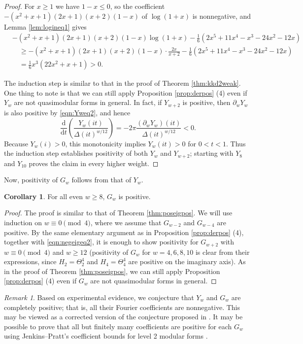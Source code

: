 \documentclass[10pt,reqno]{amsproc}
\newcommand{\dd}{\mathrm{d}}
\newcommand{\1}{\mathds{1}}	%
\theoremstyle{definition}
\newtheorem{corollary}[theorem]{Corollary}
\theoremstyle{remark}
\newtheorem{remark}[theorem]{Remark}
\begin{document}
\begin{proof}
    For $x \ge 1$ we have $1 - x \le 0$, so the coefficient $-(x^2+x+1)(2x+1)(x+2)(1-x)$ of $\log(1+x)$ is nonnegative, and Lemma \ref{lem:logineq1} gives
    \begin{align*}
        &-(x^2+x+1)(2x+1)(x+2)(1-x) \log(1+x) - \frac{1}{6} (2 x^5 + 11 x^4 - x^3 - 24 x^2 - 12 x) \\
        &\quad\ge -(x^2+x+1)(2x+1)(x+2)(1-x) \cdot \frac{2x}{x+2} - \frac{1}{6} (2 x^5 + 11 x^4 - x^3 - 24 x^2 - 12 x) \\
        &\quad= \frac{1}{6}x^3(22x^2 +x + 1) > 0.
    \end{align*}

    The induction step is similar to that in the proof of Theorem \ref{thm:kkd2weak}.
    One thing to note is that we can still apply Proposition \ref{prop:derpos} (4) even if $Y_{w}$ are not quasimodular forms in general.
    In fact, if $Y_{w+2}$ is positive, then $\partial_w Y_w$ is also positive by \eqref{eqn:Yweq2}, and hence
    \[
        \frac{\dd}{\dd t}\left(\frac{Y_w(it)}{\Delta(it)^{w/12}}\right)
        =-2\pi\frac{(\partial_w Y_w)(it)}{\Delta(it)^{w/12}}<0.
    \]
    Because $Y_w(i)>0$, this monotonicity implies $Y_w(it)>0$ for $0<t<1$.
    Thus the induction step establishes positivity of both $Y_w$ and $Y_{w+2}$; starting with $Y_8$ and $Y_{10}$ proves the claim in every higher weight.
\end{proof}

Now, positivity of $G_{w}$ follows from that of $Y_{w}$.

\begin{corollary}
\label{cor:negeigpos}
For all even $w \geq 8$, $G_{w}$ is positive.
\end{corollary}
\begin{proof}
    The proof is similar to that of Theorem \ref{thm:poseigpos}.
    We will use induction on $w \equiv 0 \pmod{4}$, where we assume that $G_{w-2}$ and $G_{w-4}$ are positive.
    By the same elementary argument as in Proposition \ref{prop:derpos} (4), together with \eqref{eqn:negeigeq2}, it is enough to show positivity for $G_{w+2}$ with $w \equiv 0 \pmod{4}$ and $w \geq 12$ (positivity of $G_w$ for $w = 4,6,8,10$ is clear from their expressions, since $H_2 = \Theta_2^4$ and $H_4 = \Theta_4^4$ are positive on the imaginary axis).
    As in the proof of Theorem \ref{thm:poseigpos}, we can still apply Proposition \ref{prop:derpos} (4) even if $G_w$ are not quasimodular forms in general.
\end{proof}

\begin{remark}
Based on experimental evidence, we conjecture that $Y_{w}$ and $G_{w}$ are completely positive; that is, all their Fourier coefficients are nonnegative.
This may be viewed as a corrected version of the conjecture proposed in \cite[Remark 6.4]{feigenbaum2021eigenfunctions}.
It may be possible to prove that all but finitely many coefficients are positive for each $G_{w}$ using Jenkins--Pratt's coefficient bounds for level 2 modular forms \cite{jenkins2014coefficient}.
\end{remark}
\end{document}
